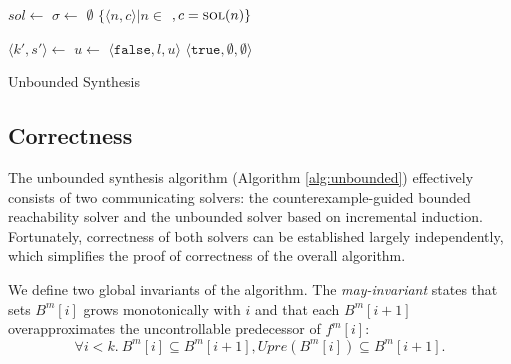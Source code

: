 \documentclass{llncs}
\newcommand{\True}{\texttt{true}}
\newcommand{\False}{\texttt{false}}
\newcommand{\textoverline}[1]{$\overline{\mbox{#1}}$}
\begin{document}
\begin{algorithm}
    \begin{algorithmic}
            \State $sol \gets $ 
                \State $\sigma \gets $  
                \State {}
                \State \Return $\emptyset$ 
            \Else
                \State \Return $\{ \langle n, c \rangle | n \in $  $, c = \Call{sol}{n} \}$ 
            \EndIf
        \EndFunction
    \end{algorithmic}

    \begin{algorithmic}
            \State $\langle k', s'\rangle \gets $  
                \State $u \gets $ \Call{\textoverline{solveAbstract}}{$\langle k', s' \rangle, \emptyset$} 
                 \Return $\langle \False, l, u \rangle$ \EndIIf {}
            \EndFor
            \State \Return $\langle \True, \emptyset, \emptyset \rangle$
        \EndFunction
    \end{algorithmic}

    \caption{Unbounded Synthesis}
    \label{alg:unbounded}
\end{algorithm}

\subsection{Correctness}

The unbounded synthesis algorithm (Algorithm \ref{alg:unbounded}) effectively
consists of two communicating solvers: the counterexample-guided bounded
reachability solver and the unbounded solver based on incremental induction.
Fortunately, correctness of both solvers can be established largely
independently, which simplifies the proof of correctness of the overall
algorithm.

We define two global invariants of the algorithm.  The \emph{may-invariant}
states that sets $B^m[i]$ grows monotonically with $i$ and that each $B^m[i+1]$
overapproximates the uncontrollable predecessor of $f^m[i]$: $$\forall
i<k.~B^m[i] \subseteq B^m[i+1], Upre(B^m[i]) \subseteq B^m[i+1].$$
\end{document}
